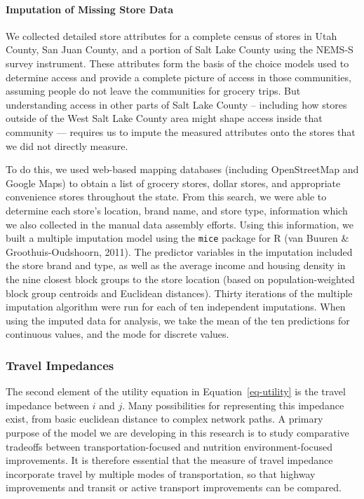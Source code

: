 \documentclass[
  letterpaper,
  number,
  review,
  3p]{elsarticle}
\let\oldparagraph\paragraph
\renewcommand{\paragraph}[1]{\oldparagraph{#1}\mbox{}}
\begin{document}
\paragraph{Imputation of Missing Store
Data}\label{imputation-of-missing-store-data}

We collected detailed store attributes for a complete census of stores
in Utah County, San Juan County, and a portion of Salt Lake County using
the NEMS-S survey instrument. These attributes form the basis of the
choice models used to determine access and provide a complete picture of
access in those communities, assuming people do not leave the
communities for grocery trips. But understanding access in other parts
of Salt Lake County -- including how stores outside of the West Salt
Lake County area might shape access inside that community --- requires
us to impute the measured attributes onto the stores that we did not
directly measure.

To do this, we used web-based mapping databases (including OpenStreetMap
and Google Maps) to obtain a list of grocery stores, dollar stores, and
appropriate convenience stores throughout the state. From this search,
we were able to determine each store's location, brand name, and store
type, information which we also collected in the manual data assembly
efforts. Using this information, we built a multiple imputation model
using the \texttt{mice} package for R (van Buuren \&
Groothuis-Oudshoorn, 2011). The predictor variables in the imputation
included the store brand and type, as well as the average income and
housing density in the nine closest block groups to the store location
(based on population-weighted block group centroids and Euclidean
distances). Thirty iterations of the multiple imputation algorithm were
run for each of ten independent imputations. When using the imputed data
for analysis, we take the mean of the ten predictions for continuous
values, and the mode for discrete values.

\subsubsection{Travel Impedances}\label{sec-mcls}

The second element of the utility equation in Equation~\ref{eq-utility}
is the travel impedance between \(i\) and \(j\). Many possibilities for
representing this impedance exist, from basic euclidean distance to
complex network paths. A primary purpose of the model we are developing
in this research is to study comparative tradeoffs between
transportation-focused and nutrition environment-focused improvements.
It is therefore essential that the measure of travel impedance
incorporate travel by multiple modes of transportation, so that highway
improvements and transit or active transport improvements can be
compared.
\end{document}
